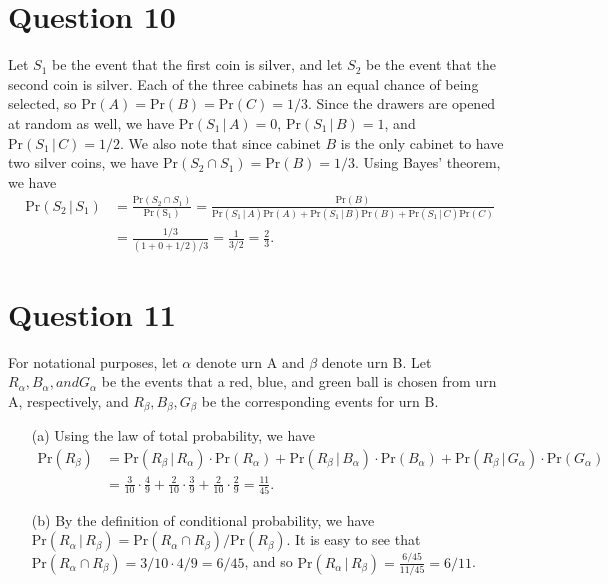 \documentclass[10pt]{article}
\begin{document}
\section{Question 10} \noindent
Let \(S_1\) be the event that the first coin is silver, and let \(S_2\) be the event that the second coin is silver. Each of the three cabinets has an equal
chance of being selected, so \(\mathrm{Pr}(A) = \mathrm{Pr}(B) = \mathrm{Pr}(C) = 1/3\). Since the drawers are opened at random as well, we have 
\(\mathrm{Pr}(S_1 \,|\, A) = 0\), \(\mathrm{Pr}(S_1 \,|\, B) = 1\), and \(\mathrm{Pr}(S_1 \,|\, C) = 1/2\). We also note that since cabinet \(B\) is the only cabinet to 
have two silver coins, we have \(\mathrm{Pr}(S_2 \cap S_1) = \mathrm{Pr}(B) = 1/3\). Using Bayes' theorem, we have 
\begin{align*}
    \mathrm{Pr}(S_2 \,|\, S_1) &= \frac{\mathrm{Pr}(S_2 \cap S_1)}{\mathrm{Pr(S_1)}} = \frac{\mathrm{Pr}(B)}{\mathrm{Pr}(S_1\,|\,A)\mathrm{Pr}(A) +
    \mathrm{Pr}(S_1\,|\,B)\mathrm{Pr}(B) + \mathrm{Pr}(S_1\,|\,C)\mathrm{Pr}(C)} \\
    &= \frac{1/3}{\left( 1 + 0 + 1/2 \right)/3} = \frac{1}{3/2} = \frac{2}{3}.
\end{align*}

\section{Question 11} \noindent
For notational purposes, let \(\alpha\) denote urn A and \(\beta\) denote urn B. Let \(R_{\alpha}, B_{\alpha}, and G_{\alpha}\) be the events that a red, 
blue, and green ball is chosen from urn A, respectively, and \(R_{\beta},B_{\beta},G_{\beta}\) be the corresponding events for urn B. 
\begin{itemize}
    \item[(a)] Using the law of total probability, we have 
    \begin{align*}
        \mathrm{Pr}(R_{\beta}) &= \mathrm{Pr}(R_{\beta}\,|\,R_{\alpha}) \cdot \mathrm{Pr}(R_{\alpha}) + \mathrm{Pr}(R_{\beta}\,|\,B_{\alpha})\cdot\mathrm{Pr}(B_{\alpha})
        + \mathrm{Pr}(R_{\beta}\,|\,G_{\alpha})\cdot\mathrm{Pr}(G_{\alpha}) \\
        &= \frac{3}{10}\cdot\frac{4}{9} + \frac{2}{10}\cdot\frac{3}{9} + \frac{2}{10}\cdot\frac{2}{9} = \frac{11}{45}.
    \end{align*}
    \item[(b)] By the definition of conditional probability, we have \(\mathrm{Pr}(R_{\alpha}\,|\,R_{\beta}) = \mathrm{Pr}(R_{\alpha}\cap R_{\beta}) / 
    \mathrm{Pr}(R_{\beta})\). It is easy to see that \(\mathrm{Pr}(R_{\alpha}\cap R_{\beta}) = 3/10 \cdot 4/9 = 6/45\), and so 
    \(\mathrm{Pr}(R_{\alpha}\,|\,R_{\beta}) = \frac{6/45}{11/45} = 6/11\).
\end{itemize}
\end{document}
